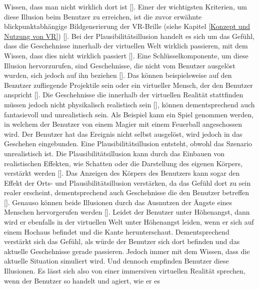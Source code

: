 \documentclass[a4paper,12pt,oneside]{article}
\begin{document}
        Wissen, dass man nicht wirklich dort ist [\cite{Slater2009}]. Einer der wichtigsten
        Kriterien, um diese Illusion beim Benutzer zu erreichen, ist die zuvor erwähnte
        blickpunktabhängige Bildgenerierung der VR-Brille (siehe Kapitel 
        \ref{Konzept und Nutzung von VR}) [\cite[18]{Dorner2013}]. 
        Bei der Plausibilitätsillusion handelt
        es sich um das Gefühl, dass die Geschehnisse innerhalb der virtuellen Welt 
        wirklich passieren, mit dem Wissen, dass dies nicht wirklich passiert
        [\cite{Slater2009}]. Eine Schlüsselkomponente, um diese Illusion hervorzurufen,
        sind Geschehnisse, die nicht vom Benutzer ausgelöst wurden, sich jedoch auf ihn
        beziehen [\cite{Slater2009}]. Das können beispielsweise auf den Benutzer zufliegende
        Projektile sein oder ein virtueller Mensch, der den Benutzer anspricht
        [\cite[18-19]{Dorner2013}]. Die Geschehnisse die innerhalb der virtuellen Realität
        stattfinden müssen jedoch nicht physikalisch realistisch sein [\cite{Slater2009}], 
        können dementsprechend auch fantasievoll und unrealistisch sein. Als Beispiel kann
        ein Spiel genommen werden, in welchem der Benutzer von einem Magier mit einem 
        Feuerball angeschossen wird. Der Benutzer hat das Ereignis nicht selbst ausgelöst,
        wird jedoch in das Geschehen eingebunden. Eine Plausibilitätsillusion entsteht,
        obwohl das Szenario unrealistisch ist. Die Plausibilitätsillusion kann durch das
        Einbauen von realistischen Effekten, wie Schatten oder die Darstellung des eigenen
        Körpers, verstärkt werden [\cite{Slater2009}]. Das Anzeigen des Körpers des Benutzers
        kann sogar den Effekt der Orts- und Plausibilitätsillusion verstärken, da das
        Gefühl dort zu sein realer erscheint, dementsprechend auch Geschehnisse die den
        Benutzer betreffen [\cite{Slater2009}]. Genauso können beide Illusionen durch das
        Ausnutzen der Ängste eines Menschen hervorgerufen werden [\cite{Slater2009}].
        Leidet der Benutzer unter Höhenangst, dann wird er ebenfalls in der virtuellen
        Welt unter Höhenangst leiden, wenn er sich auf einem Hochaus befindet und die
        Kante herunterschaut. Dementsprechend verstärkt sich das Gefühl, als würde der
        Benutzer sich dort befinden und das aktuelle Geschehnisse gerade passieren. Jedoch
        immer mit dem Wissen, dass die aktuelle Situation simuliert wird. Und dennoch
        empfinden Benutzer diese Illusionen. Es lässt sich also von einer immersiven
        virtuellen Realität sprechen, wenn der Benutzer so handelt und agiert, wie er es
\end{document}
